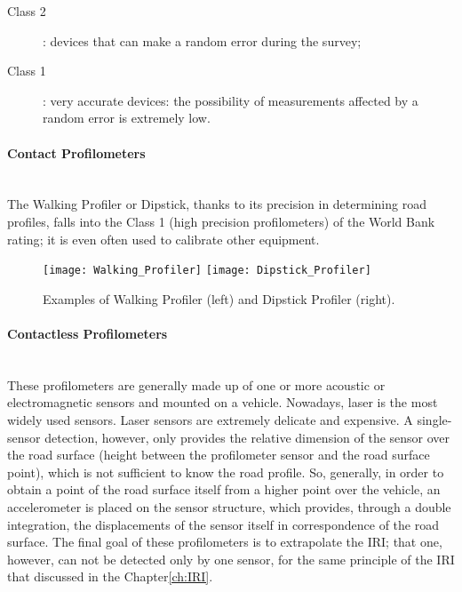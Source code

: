 \documentclass[tesi]{subfiles}
\begin{document}
\begin{enumerate}
\begin{description}
	\item [Class 2]: devices that can make a random error during the survey;
	\item [Class 1]: very accurate devices: the possibility of measurements affected by a random error is extremely low.

\end{description}
\clearpage
\paragraph{Contact Profilometers}\leavevmode\\
The Walking Profiler or Dipstick\cite{little_book}, thanks to its precision in determining road profiles, falls into the Class 1 (high precision profilometers) of the World Bank rating\cite{sayers1995calculation}; it is even often used to calibrate other equipment.


\begin{figure}[H]
\centering
\texttt{[image: Walking\_Profiler]}
\hspace{1.5cm}
\texttt{[image: Dipstick\_Profiler]}
\caption{Examples of Walking Profiler (left) and Dipstick Profiler (right).}
\label{fig:contact_profiler}
\end{figure}
\vspace{1.5cm}
\paragraph{Contactless Profilometers}\leavevmode\\  These profilometers are generally made up of one or more acoustic or electromagnetic sensors and mounted on a vehicle. Nowadays, laser is the most widely used sensors.
Laser sensors are extremely delicate and expensive. A single-sensor detection, however, only provides the relative dimension of the sensor over the road surface (height between the profilometer sensor and the road surface point), which is not sufficient to know the road profile. So, generally, in order to obtain a point of the road surface itself from a higher point over the vehicle, an accelerometer is placed on the sensor structure, which provides, through a double integration, the displacements of the sensor itself in correspondence of the road surface. \clearpage The final goal of these profilometers is to extrapolate the IRI; that one, however, can not be detected only by one sensor, for the same principle of the IRI that discussed in the Chapter\ref{ch:IRI}.


\end{enumerate}
\end{document}
